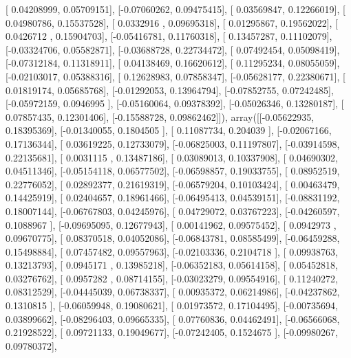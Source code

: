 \documentclass{article}
\begin{document}
       [ 0.04208999,  0.05709151],
       [-0.07060262,  0.09475415],
       [ 0.03569847,  0.12266019],
       [ 0.04980786,  0.15537528],
       [ 0.0332916 ,  0.09695318],
       [ 0.01295867,  0.19562022],
       [ 0.0426712 ,  0.15904703],
       [-0.05416781,  0.11760318],
       [ 0.13457287,  0.11102079],
       [-0.03324706,  0.05582871],
       [-0.03688728,  0.22734472],
       [ 0.07492454,  0.05098419],
       [-0.07312184,  0.11318911],
       [ 0.04138469,  0.16620612],
       [ 0.11295234,  0.08055059],
       [-0.02103017,  0.05388316],
       [ 0.12628983,  0.07858347],
       [-0.05628177,  0.22380671],
       [ 0.01819174,  0.05685768],
       [-0.01292053,  0.13964794],
       [-0.07852755,  0.07242485],
       [-0.05972159,  0.0946995 ],
       [-0.05160064,  0.09378392],
       [-0.05026346,  0.13280187],
       [ 0.07857435,  0.12301406],
       [-0.15588728,  0.09862462]]), array([[-0.05622935,  0.18395369],
       [-0.01340055,  0.1804505 ],
       [ 0.11087734,  0.204039  ],
       [-0.02067166,  0.17136344],
       [ 0.03619225,  0.12733079],
       [-0.06825003,  0.11197807],
       [-0.03914598,  0.22135681],
       [ 0.0031115 ,  0.13487186],
       [ 0.03089013,  0.10337908],
       [ 0.04690302,  0.04511346],
       [-0.05154118,  0.06577502],
       [-0.06598857,  0.19033755],
       [ 0.08952519,  0.22776052],
       [ 0.02892377,  0.21619319],
       [-0.06579204,  0.10103424],
       [ 0.00463479,  0.14425919],
       [ 0.02404657,  0.18961466],
       [-0.06495413,  0.04539151],
       [-0.08831192,  0.18007144],
       [-0.06767803,  0.04245976],
       [ 0.04729072,  0.03767223],
       [-0.04260597,  0.1088967 ],
       [-0.09695095,  0.12677943],
       [ 0.00141962,  0.09575452],
       [ 0.0942973 ,  0.09670775],
       [ 0.08370518,  0.04052086],
       [-0.06843781,  0.08585499],
       [-0.06459288,  0.15498884],
       [ 0.07457482,  0.09557963],
       [-0.02103336,  0.2104718 ],
       [ 0.09938763,  0.13213793],
       [ 0.0945171 ,  0.13985218],
       [-0.06352183,  0.05614158],
       [ 0.05452818,  0.03276762],
       [ 0.0957282 ,  0.08714155],
       [-0.03023279,  0.09554916],
       [ 0.11240272,  0.08312529],
       [-0.04445039,  0.06738337],
       [ 0.00935372,  0.06214986],
       [-0.04237862,  0.1310815 ],
       [-0.06059948,  0.19080621],
       [ 0.01973572,  0.17104495],
       [-0.00735694,  0.03899662],
       [-0.08296403,  0.09665335],
       [ 0.07760836,  0.04462491],
       [-0.06566068,  0.21928522],
       [ 0.09721133,  0.19049677],
       [-0.07242405,  0.1524675 ],
       [-0.09980267,  0.09780372],
\end{document}
